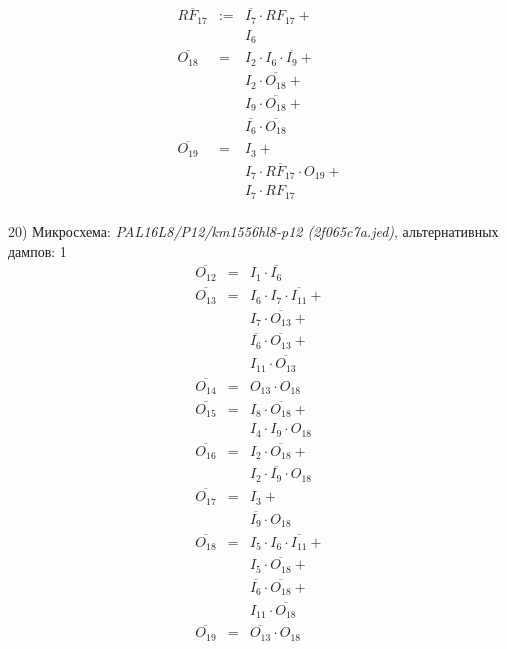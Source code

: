 \documentclass[a4paper,russian]{report}
\begin{document}
\begin{eqnarray*}
    \overline{RF_{17}} & := & \overline{I_{7}} \cdotp RF_{17} + \\
	& &  I_{6} \\
    \overline{O_{18}} & = & I_{2} \cdotp I_{6} \cdotp \overline{I_{9}} + \\
	& &  I_{2} \cdotp \overline{O_{18}} + \\
	& &  I_{9} \cdotp \overline{O_{18}} + \\
	& &  \overline{I_{6}} \cdotp \overline{O_{18}} \\
    \overline{O_{19}} & = & I_{3} + \\
	& &  I_{7} \cdotp \overline{RF_{17}} \cdotp O_{19} + \\
	& &  I_{7} \cdotp RF_{17} \\
 \end{eqnarray*}
\pagebreak[1]


20) Микросхема: \emph{PAL16L8/P12/km1556hl8-p12  (2f065c7a.jed)}, альтернативных дампов: 1
\nopagebreak\begin{eqnarray*}
    \overline{O_{12}} & = & I_{1} \cdotp \overline{I_{6}} \\
    \overline{O_{13}} & = & I_{6} \cdotp I_{7} \cdotp \overline{I_{11}} + \\
	& &  I_{7} \cdotp \overline{O_{13}} + \\
	& &  \overline{I_{6}} \cdotp \overline{O_{13}} + \\
	& &  I_{11} \cdotp \overline{O_{13}} \\
    \overline{O_{14}} & = & O_{13} \cdotp O_{18} \\
    \overline{O_{15}} & = & I_{8} \cdotp \overline{O_{18}} + \\
	& &  I_{4} \cdotp I_{9} \cdotp O_{18} \\
    \overline{O_{16}} & = & I_{2} \cdotp \overline{O_{18}} + \\
	& &  I_{2} \cdotp \overline{I_{9}} \cdotp O_{18} \\
    \overline{O_{17}} & = & I_{3} + \\
	& &  \overline{I_{9}} \cdotp O_{18} \\
    \overline{O_{18}} & = & I_{5} \cdotp I_{6} \cdotp \overline{I_{11}} + \\
	& &  I_{5} \cdotp \overline{O_{18}} + \\
	& &  \overline{I_{6}} \cdotp \overline{O_{18}} + \\
	& &  I_{11} \cdotp \overline{O_{18}} \\
    \overline{O_{19}} & = & \overline{O_{13}} \cdotp O_{18} \\
 \end{eqnarray*}
\pagebreak[1]
\end{document}
